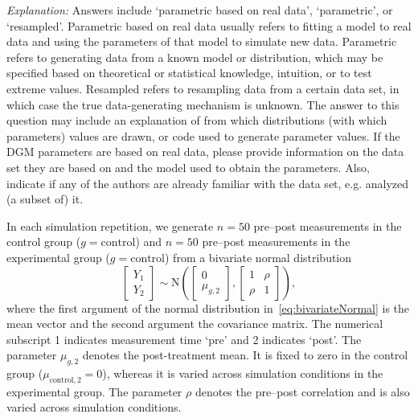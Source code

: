 \documentclass[12pt]{article}
\begin{document}
\textit{Explanation:} Answers include `parametric based on real data', `parametric', or `resampled'. Parametric based on real data usually refers to fitting a model to real data and using the parameters of that model to simulate new data. Parametric refers to generating data from a known model or distribution, which may be specified based on theoretical or statistical knowledge, intuition, or to test extreme values. Resampled refers to resampling data from a certain data set, in which case the true data-generating mechanism is unknown. The answer to this question may include an explanation of from which distributions (with which parameters) values are drawn, or code used to generate parameter values. If the DGM parameters are based on real data, please provide information on the data set they are based on and the model used to obtain the parameters. Also, indicate if any of the authors are already familiar with the data set, e.g. analyzed (a subset of) it.

\begin{examplebox}
In each simulation repetition, we generate $n=50$ pre--post measurements in the control group ($g = \text{control}$) and $n = 50$ pre--post measurements in the experimental group ($g = \text{control}$) from a bivariate normal distribution
\begin{equation}
    \label{eq:bivariateNormal}
    \left[\begin{array}{c}Y_1 \\ Y_2 \end{array}\right] \sim\text{N}\left(\left[\begin{array}{c}0 \\ \mu_{g,2} \end{array}\right],\left[\begin{array}{cc} 1 & \rho  \\ \rho & 1 \end{array}\right]\right),
\end{equation}
where the first argument of the normal distribution in~\eqref{eq:bivariateNormal} is the mean vector and the second argument the covariance matrix.
The numerical subscript 1 indicates measurement time `pre' and 2 indicates `post'. The parameter $\mu_{g,2}$ denotes the post-treatment mean. It is fixed to zero in the control group (${\mu_{\text{control},2}} = 0$), whereas it is varied across simulation conditions in the experimental group. The parameter $\rho$ denotes the pre--post correlation and is also varied across simulation conditions.
\end{examplebox}
\end{document}
